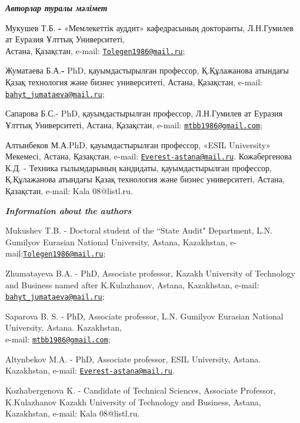 \begin{authorinfo}
\hspace{1em}\emph{{\bfseries Авторлар туралы мәлімет}}

Мукушев Т.Б. {\bfseries -} «Мемлекеттік ауддит» кафедрасының докторанты,
Л.Н.Гумилев ат Еуразия Ұлттық Университеті,\\ Астана, Қазақстан, e-mail:
\href{mailto:Tolegen1986@mail.ru}{\nolinkurl{Tolegen1986@mail.ru}};

Жуматаева Б.А.{\bfseries -} PhD, қауымдастырылған профессор, Қ.Құлажанова
атындағы Қазақ технология және бизнес университеті, Астана, Қазақстан,
e-mail:
\href{mailto:bahyt_jumataeva@mail.ru}{\nolinkurl{bahyt\_jumataeva@mail.ru}};

Сапарова Б.С.- PhD, қауымдастырылған профессор, Л.Н.Гумилев ат Еуразия
Ұлттық Университеті, Астана, Қазақстан\emph{,} e-mail:
\href{mailto:mtbb1986@gmail.com}{\nolinkurl{mtbb1986@gmail.com}};

Алтынбеков М.А.PhD, қауымдастырылған профессор, «ESIL University»
Мекемесі, Астана, Қазақстан, e-mail:
\href{mailto:Everest-astana@mail.ru}{\nolinkurl{Everest-astana@mail.ru}}.
Кожабергенова К.Д. - Техника ғылымдарының кандидаты, қауымдастырылған профессор, Қ.Құлажанова  атындағы Қазақ технология және бизнес университеті,
Астана, Қазақстан, e-mail: Kala 08@listl.ru.

\hspace{1em}\emph{{\bfseries Information about the authors}}

Mukushev T.B. - Doctoral student of the ``State Audit" Department, L.N.
Gumilyov Eurasian National University, Astana, Kazakhstan,
e-mail:\href{mailto:Tolegen1986@mail.ru}{\nolinkurl{Tolegen1986@mail.ru}};

Zhumatayeva B.A. - PhD, Associate professor, Kazakh University of
Technology and Business named after K.Kulazhanov, Astana, Kazakhstan,
e-mail:
\href{mailto:bahyt_jumataeva@mail.ru}{\nolinkurl{bahyt\_jumataeva@mail.ru}};

Saparova B. S. - PhD, Associate professor, L.N. Gumilyov Eurasian
National University, Astana. Kazakhstan, \\e-mail:
\href{mailto:mtbb1986@gmail.com}{\nolinkurl{mtbb1986@gmail.com}};

Altynbekov M.A. - PhD, Associate professor, ESIL University, Astana.
Kazakhstan, e-mail:
\href{mailto:Everest-astana@mail.ru}{\nolinkurl{Everest-astana@mail.ru}}.

Kozhabergenova K. - Candidate of Technical Sciences, Associate Professor, K.Kulazhanov Kazakh University of Technology and Business,
 Astana, Kazakhstan, e-mail: Kala 08@listl.ru.
\end{authorinfo}

